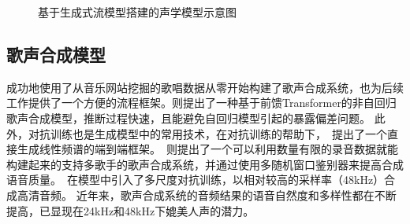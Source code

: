 \begin{figure}[htbp]
  \caption{基于生成式流模型搭建的声学模型示意图}
\end{figure}

\subsection{歌声合成模型}
\citet{ren2020deepsinger}成功地使用了从音乐网站挖掘的歌唱数据从零开始构建了歌声合成系统，也为后续工作提供了一个方便的流程框架。\citet{blaauw2020sequence}则提出了一种基于前馈Transformer的非自回归歌声合成模型，推断过程快速，且能避免自回归模型引起的暴露偏差问题。
此外，对抗训练也是生成模型中的常用技术，在对抗训练的帮助下，\citet{lee2019adversarially}~提出了一个直接生成线性频谱的端到端框架。\citet{wu2020adversarially}~则提出了一个可以利用数量有限的录音数据就能构建起来的支持多歌手的歌声合成系统，并通过使用多随机窗口鉴别器来提高合成语音质量。\citet{chen2020hifisinger}~在模型中引入了多尺度对抗训练，以相对较高的采样率（48kHz）合成高清音频。
近年来，歌声合成系统的音频结果的语音自然度和多样性都在不断提高，已显现在24kHz和48kHz下媲美人声的潜力。

